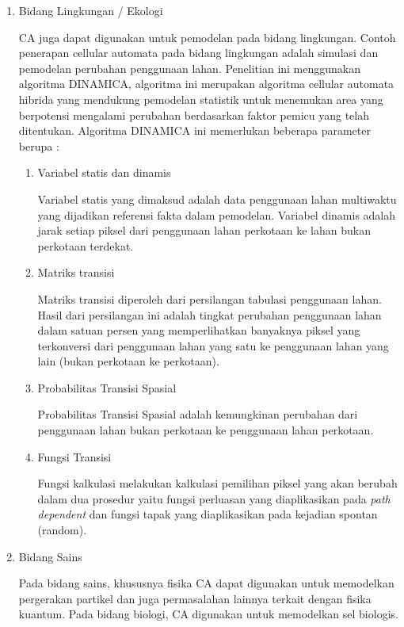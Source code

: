 \begin{enumerate}
			\item Bidang Lingkungan / Ekologi
			
			CA juga dapat digunakan untuk pemodelan pada bidang lingkungan. Contoh penerapan cellular automata pada bidang lingkungan adalah simulasi dan pemodelan perubahan penggunaan lahan. Penelitian ini menggunakan algoritma DINAMICA, algoritma ini merupakan algoritma cellular automata hibrida yang mendukung pemodelan statistik untuk menemukan area yang berpotensi mengalami perubahan berdasarkan faktor pemicu yang telah ditentukan. Algoritma DINAMICA ini memerlukan beberapa parameter berupa :
			\begin{enumerate}
				\item Variabel statis dan dinamis
				
				Variabel statis yang dimaksud adalah data penggunaan lahan multiwaktu yang dijadikan referensi fakta dalam pemodelan. Variabel dinamis adalah jarak setiap piksel dari penggunaan lahan perkotaan ke lahan bukan perkotaan terdekat.
				\item Matriks transisi
				
				Matriks transisi diperoleh dari persilangan tabulasi penggunaan lahan. Hasil dari persilangan ini adalah tingkat perubahan penggunaan lahan dalam satuan persen yang memperlihatkan banyaknya piksel yang terkonversi dari penggunaan lahan yang satu ke penggunaan lahan yang lain (bukan perkotaan ke perkotaan).
				\item Probabilitas Transisi Spasial
				
				Probabilitas Transisi Spasial adalah kemungkinan perubahan dari penggunaan lahan bukan perkotaan ke penggunaan lahan perkotaan.
				\item Fungsi Transisi
				
				Fungsi kalkulasi melakukan kalkulasi pemilihan piksel yang akan berubah dalam dua prosedur yaitu fungsi perluasan yang diaplikasikan pada \textit{path dependent} dan fungsi tapak yang diaplikasikan pada kejadian spontan (random). \cite{referensiCA4}
			\end{enumerate}
			
			\item Bidang Sains
			
			Pada bidang sains, khususnya fisika CA dapat digunakan untuk memodelkan pergerakan partikel dan juga permasalahan lainnya terkait dengan fisika kuantum. Pada bidang biologi, CA digunakan untuk memodelkan sel biologis.
		\end{enumerate}
		


